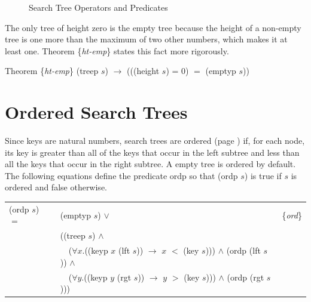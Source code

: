 \begin{figure}
\caption{Search Tree Operators and Predicates}
\label{fig:tree-functions}
\end{figure}

The only tree of height zero is the empty tree because
the height of a non-empty tree is one more than the maximum
of two other numbers, which makes it at least one.
Theorem \{\emph{ht-emp}\} states this fact more rigorously.

\label{thm:ht-emp}
Theorem \{\emph{ht-emp}\} \textsf{(treep $s$)} $\rightarrow$ ((\textsf{(height $s$) = 0)} $=$ \textsf{(emptyp $s$)})
\section{Ordered Search Trees}

Since keys are natural numbers,
search trees are ordered (page \pageref{ordered-def}) if, for each node,
its key is greater than all of the keys that occur in the left subtree
and less than all the keys that occur in the right subtree.
A empty tree is ordered by default.
The following equations define
the predicate \textsf{ordp} so that
\textsf{(ordp $s$)} is true if $s$ is ordered and false otherwise.

\begin{center}
\label{def:ordp}
\begin{tabular}{lll}
\textsf{(ordp $s$)} $=$ & \textsf{(emptyp $s$)} $\vee$ & \{\emph{ord}\} \\
             & (\textsf{(treep $s$)}  $\wedge$                        \\
             & ~~($\forall x$.(\textsf{(keyp $x$ (lft $s$)}) $\rightarrow$ $x$ $<$ \textsf{(key $s$)})) $\wedge$ \textsf{(ordp (lft $s$))} $\wedge$ & \\
             & ~~($\forall y$.(\textsf{(keyp $y$ (rgt $s$))} $\rightarrow$ $y$ $>$ \textsf{(key $s$)})) $\wedge$ \textsf{(ordp (rgt $s$))})         & \\
\end{tabular}
\end{center}

